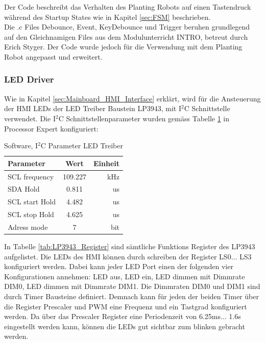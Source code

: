 Der Code beschreibt das Verhalten des Planting Robots auf einen Tastendruck während des Startup States wie in Kapitel \ref{sec:FSM} beschrieben. \\
\newline
Die .c Files Debounce, Event, KeyDebounce und Trigger beruhen grundlegend auf den Gleichnamigen Files aus dem Modulunterricht INTRO, betreut durch Erich Styger. Der Code wurde jedoch für die Verwendung mit dem Planting Robot angepasst und erweitert.

\subsubsection{LED Driver}
Wie in Kapitel \ref{sec:Mainboard_HMI_Interface} erklärt, wird für die Ansteuerung der HMI LEDs der LED Treiber Baustein LP3943, mit I$^{2}$C Schnittstelle verwendet. Die I$^{2}$C Schnittstellenparameter wurden gemäss Tabelle \ref{tab:I2C_Parameter} in Processor Expert konfiguriert:

\begin{table}[H]
	\centering
	\caption{Software, I$^{2}$C Parameter LED Treiber}
	\begin{tabular}{|l|c|r|}
		\hline
		\textbf{Parameter} & \textbf{Wert} & \textbf{Einheit} \\
		\hline
		SCL frequency & 109.227 & kHz \\
		\hline
		SDA Hold & 0.811 & us \\
		\hline
		SCL start Hold & 4.482 & us \\
		\hline
		SCL stop Hold & 4.625 & us \\
		\hline
		Adress mode & 7     & bit \\
		\hline
	\end{tabular}%
	\label{tab:I2C_Parameter}%
\end{table}%

In Tabelle \ref{tab:LP3943_Register} sind sämtliche Funktions Register des LP3943 aufgelistet. Die LEDs des HMI können durch schreiben der Register LS0... LS3 konfiguriert werden. Dabei kann jeder LED Port einen der folgenden vier Konfigurationen annehmen: LED aus, LED ein, LED dimmen mit Dimmrate DIM0, LED dimmen mit Dimmrate DIM1. Die Dimmraten DIM0 und DIM1 sind durch Timer Bausteine definiert. Demnach kann für jeden der beiden Timer über die Register Prescaler und PWM eine Frequenz und ein Tastgrad konfiguriert werden. Da über das Prescaler Register eine Periodenzeit von 6.25ms... 1.6s eingestellt werden kann, können die LEDs gut sichtbar zum blinken gebracht werden.

